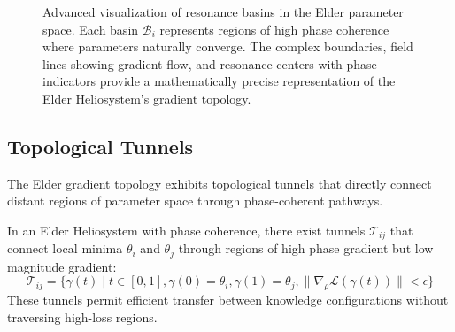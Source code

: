 \begin{figure}[ht]
\caption{Advanced visualization of resonance basins in the Elder parameter space. Each basin $\mathcal{B}_i$ represents regions of high phase coherence where parameters naturally converge. The complex boundaries, field lines showing gradient flow, and resonance centers with phase indicators provide a mathematically precise representation of the Elder Heliosystem's gradient topology.}
\label{fig:resonance_basins}
\end{figure}

\subsection{Topological Tunnels}

The Elder gradient topology exhibits topological tunnels that directly connect distant regions of parameter space through phase-coherent pathways.

\begin{theorem}
In an Elder Heliosystem with phase coherence, there exist tunnels $\mathcal{T}_{ij}$ that connect local minima $\theta_i$ and $\theta_j$ through regions of high phase gradient but low magnitude gradient:
\begin{equation}
\mathcal{T}_{ij} = \{\gamma(t) \mid t \in [0,1], \gamma(0) = \theta_i, \gamma(1) = \theta_j, \|\nabla_{\rho}\mathcal{L}(\gamma(t))\| < \epsilon\}
\end{equation}
These tunnels permit efficient transfer between knowledge configurations without traversing high-loss regions.
\end{theorem}

